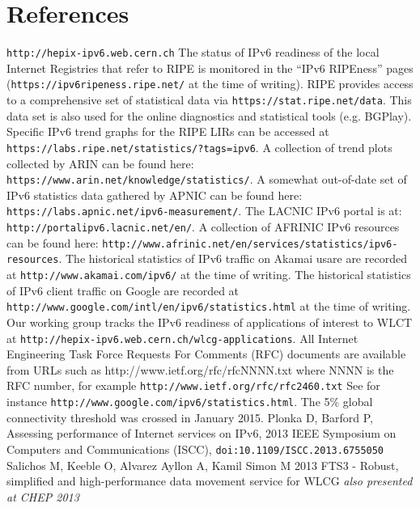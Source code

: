 \section*{References}

\begin{thebibliography}{1}
 {\tt http://hepix-ipv6.web.cern.ch}
 The status of IPv6 readiness of the local Internet Registries
that refer to RIPE is monitored in the ``IPv6 RIPEness'' pages ({\tt https://ipv6ripeness.ripe.net/} at the time of writing). 
 RIPE provides access to a comprehensive set of statistical
data via {\tt https://stat.ripe.net/data}. This data set is also used for
the online diagnostics and statistical tools (e.g. BGPlay). 
 Specific
IPv6 trend graphs for the RIPE LIRs can be accessed at {\tt https://labs.ripe.net/statistics/?tags=ipv6}.
 A collection of trend plots collected by ARIN
can be found here: {\tt https://www.arin.net/knowledge/statistics/}.
 A somewhat out-of-date set of IPv6
statistics data gathered by APNIC can be found here: {\tt https://labs.apnic.net/ipv6-measurement/}.
 The LACNIC IPv6 portal is at: {\tt http://portalipv6.lacnic.net/en/}.
 A collection of AFRINIC IPv6 resources can be found here: {\tt http://www.afrinic.net/en/services/statistics/ipv6-resources}.
 The historical statistics of IPv6 traffic on Akamai usare are recorded
at {\tt http://www.akamai.com/ipv6/} at the time of writing.
 The historical statistics of IPv6 client traffic on Google are recorded
at {\tt http://www.google.com/intl/en/ipv6/statistics.html} at the time of writing.
 Our working group tracks the IPv6 readiness of applications
of interest to WLCT at {\tt http://hepix-ipv6.web.cern.ch/wlcg-applications}.
 All Internet Engineering Task Force Requests For Comments (RFC) documents are available
from URLs such as http://www.ietf.org/rfc/rfcNNNN.txt where NNNN is the RFC number, for example {\tt http://www.ietf.org/rfc/rfc2460.txt}
 See for instance {\tt http://www.google.com/ipv6/statistics.html}. The 5\% global connectivity threshold was crossed in January 2015.
 Plonka D, Barford P, Assessing performance of Internet services on IPv6, 2013 IEEE Symposium on Computers and Communications (ISCC), {\tt doi:10.1109/ISCC.2013.6755050}
    Salichos M, Keeble O, Alvarez Ayllon A, Kamil Simon M 2013 FTS3 - Robust, simplified and high-performance data movement service for WLCG {\it also presented at CHEP 2013}
\end{thebibliography}
